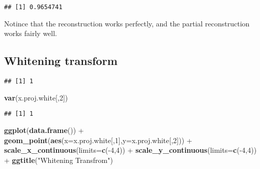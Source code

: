 \documentclass[]{article}
\newenvironment{Shaded}{\begin{snugshade}}{\end{snugshade}}
\newcommand{\KeywordTok}[1]{\textcolor[rgb]{0.13,0.29,0.53}{\textbf{{#1}}}}
\newcommand{\DataTypeTok}[1]{\textcolor[rgb]{0.13,0.29,0.53}{{#1}}}
\newcommand{\DecValTok}[1]{\textcolor[rgb]{0.00,0.00,0.81}{{#1}}}
\newcommand{\StringTok}[1]{\textcolor[rgb]{0.31,0.60,0.02}{{#1}}}
\newcommand{\NormalTok}[1]{{#1}}
\begin{document}
\begin{verbatim}
## [1] 0.9654741
\end{verbatim}

Notince that the reconstruction works perfectly, and the partial
reconstruction works fairly well.

\subsection{Whitening transform}\label{whitening-transform}

\begin{Shaded}
\end{Shaded}

\begin{verbatim}
## [1] 1
\end{verbatim}

\begin{Shaded}
\begin{Highlighting}[]
\KeywordTok{var}\NormalTok{(x.proj.white[,}\DecValTok{2}\NormalTok{])}
\end{Highlighting}
\end{Shaded}

\begin{verbatim}
## [1] 1
\end{verbatim}

\begin{Shaded}
\begin{Highlighting}[]
\KeywordTok{ggplot}\NormalTok{(}\KeywordTok{data.frame}\NormalTok{()) +}\StringTok{ }\KeywordTok{geom_point}\NormalTok{(}\KeywordTok{aes}\NormalTok{(}\DataTypeTok{x=}\NormalTok{x.proj.white[,}\DecValTok{1}\NormalTok{],}\DataTypeTok{y=}\NormalTok{x.proj.white[,}\DecValTok{2}\NormalTok{])) +}\StringTok{ }\KeywordTok{scale_x_continuous}\NormalTok{(}\DataTypeTok{limits=}\KeywordTok{c}\NormalTok{(-}\DecValTok{4}\NormalTok{,}\DecValTok{4}\NormalTok{))  +}\StringTok{ }\KeywordTok{scale_y_continuous}\NormalTok{(}\DataTypeTok{limits=}\KeywordTok{c}\NormalTok{(-}\DecValTok{4}\NormalTok{,}\DecValTok{4}\NormalTok{)) +}\StringTok{ }\KeywordTok{ggtitle}\NormalTok{(}\StringTok{"Whitening Transfrom"}\NormalTok{)}
\end{Highlighting}
\end{Shaded}
\end{document}
